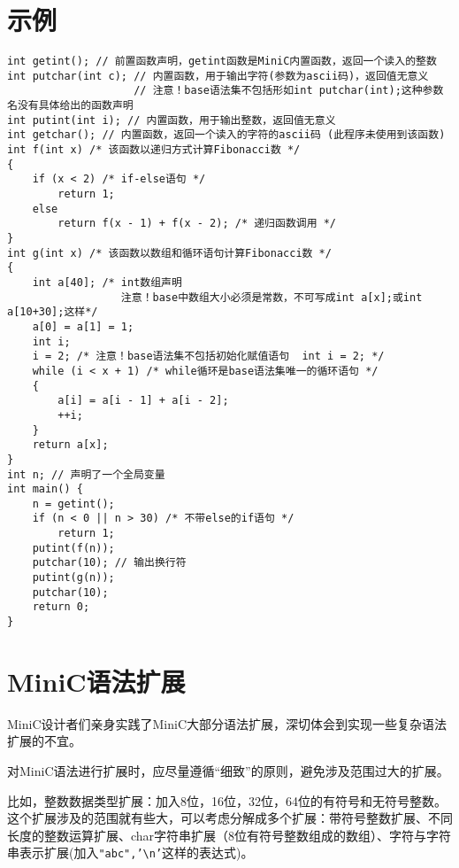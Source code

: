 \documentclass{ctexart}
\begin{document}
\section{示例}
\small
\begin{verbatim}
int getint(); // 前置函数声明，getint函数是MiniC内置函数，返回一个读入的整数
int putchar(int c); // 内置函数，用于输出字符(参数为ascii码)，返回值无意义
                    // 注意！base语法集不包括形如int putchar(int);这种参数名没有具体给出的函数声明
int putint(int i); // 内置函数，用于输出整数，返回值无意义
int getchar(); // 内置函数，返回一个读入的字符的ascii码 (此程序未使用到该函数)
int f(int x) /* 该函数以递归方式计算Fibonacci数 */
{
    if (x < 2) /* if-else语句 */
        return 1;
    else
        return f(x - 1) + f(x - 2); /* 递归函数调用 */
}
int g(int x) /* 该函数以数组和循环语句计算Fibonacci数 */
{
    int a[40]; /* int数组声明
                  注意！base中数组大小必须是常数，不可写成int a[x];或int a[10+30];这样*/
    a[0] = a[1] = 1;
    int i;
    i = 2; /* 注意！base语法集不包括初始化赋值语句  int i = 2; */
    while (i < x + 1) /* while循环是base语法集唯一的循环语句 */
    {
        a[i] = a[i - 1] + a[i - 2];
        ++i;
    }
    return a[x];
}
int n; // 声明了一个全局变量
int main() {
    n = getint();
    if (n < 0 || n > 30) /* 不带else的if语句 */
        return 1;
    putint(f(n));
    putchar(10); // 输出换行符
    putint(g(n));
    putchar(10);
    return 0;
}
\end{verbatim}
\newpage
\normalsize
\section{MiniC语法扩展}
MiniC设计者们亲身实践了MiniC大部分语法扩展，深切体会到实现一些复杂语法扩展的不宜。

对MiniC语法进行扩展时，应尽量遵循“细致”的原则，避免涉及范围过大的扩展。

比如，整数数据类型扩展：加入8位，16位，32位，64位的有符号和无符号整数。这个扩展涉及的范围就有些大，可以考虑分解成多个扩展：带符号整数扩展、不同长度的整数运算扩展、char字符串扩展（8位有符号整数组成的数组）、字符与字符串表示扩展(加入\texttt{"abc",'\textbackslash n'}这样的表达式)。
\end{document}
